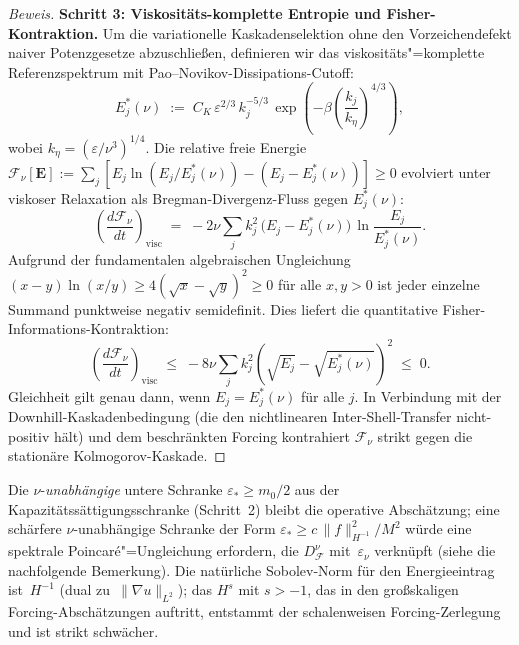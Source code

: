 \documentclass[12pt,a4paper]{article}
\theoremstyle{breakdef}
\theoremstyle{breakplain}
\theoremstyle{breakdef}
\begin{document}
\begin{proof}[Beweis]
\textbf{Schritt 3: Viskositäts-komplette Entropie und Fisher-Kontraktion.}\quad
Um die variationelle Kaskadenselektion ohne den Vorzeichendefekt naiver Potenzgesetze abzuschließen, definieren wir das viskositäts"=komplette Referenzspektrum mit Pao--Novikov-Dissipations-Cutoff:
\begin{equation}\label{eq:E_star_nu}
  E_j^*(\nu) \;:=\; C_K\,\varepsilon^{2/3}\,k_j^{-5/3}\,\exp\!\left(-\beta \left(\frac{k_j}{k_\eta}\right)^{4/3}\right),
\end{equation}
wobei $k_\eta = (\varepsilon/\nu^3)^{1/4}$. Die relative freie Energie $\mathcal{F}_\nu[\mathbf{E}] := \sum_j [E_j \ln(E_j/E_j^*(\nu)) - (E_j - E_j^*(\nu))] \ge 0$ evolviert unter viskoser Relaxation als Bregman-Divergenz-Fluss gegen $E_j^*(\nu)$:
\begin{equation}\label{eq:F_decay}
  \left(\frac{d\mathcal{F}_\nu}{dt}\right)_{\!\mathrm{visc}}
  \;=\;
  -2\nu \sum_j k_j^2\,\bigl(E_j - E_j^*(\nu)\bigr)\,\ln\frac{E_j}{E_j^*(\nu)}.
\end{equation}
Aufgrund der fundamentalen algebraischen Ungleichung $(x - y)\ln(x/y) \ge 4(\sqrt{x} - \sqrt{y})^2 \ge 0$ für alle $x, y > 0$ ist jeder einzelne Summand punktweise negativ semidefinit. Dies liefert die quantitative Fisher-Informations-Kontraktion:
\begin{equation}\label{eq:Fisher_bound}
  \left(\frac{d\mathcal{F}_\nu}{dt}\right)_{\!\mathrm{visc}}
  \;\le\;
  -8\nu \sum_j k_j^2 \left(\sqrt{E_j} - \sqrt{E_j^*(\nu)}\right)^2 \;\le\; 0.
\end{equation}
Gleichheit gilt genau dann, wenn $E_j = E_j^*(\nu)$ für alle $j$. In Verbindung mit der Downhill-Kaskadenbedingung (die den nichtlinearen Inter-Shell-Transfer nicht-positiv hält) und dem beschränkten Forcing kontrahiert $\mathcal{F}_\nu$ strikt gegen die stationäre Kolmogorov-Kaskade.
\end{proof}
Die $\nu$-\emph{unabhängige} untere Schranke $\varepsilon_* \ge m_0/2$ aus der Kapazitätssättigungsschranke (Schritt~2) bleibt die operative Abschätzung; eine schärfere $\nu$-unabhängige Schranke der Form $\varepsilon_* \ge c\,\|f\|_{H^{-1}}^2 / M^2$ würde eine spektrale Poincaré"=Ungleichung erfordern, die $D_\mathcal{F}^\nu$ mit~$\varepsilon_\nu$ verknüpft (siehe die nachfolgende Bemerkung). Die natürliche Sobolev-Norm für den Energieeintrag ist~$H^{-1}$ (dual zu~$\|\nabla u\|_{L^2}$); das $H^s$ mit $s > -1$, das in den großskaligen Forcing-Abschätzungen auftritt, entstammt der schalenweisen Forcing-Zerlegung und ist strikt schwächer.
\end{document}
